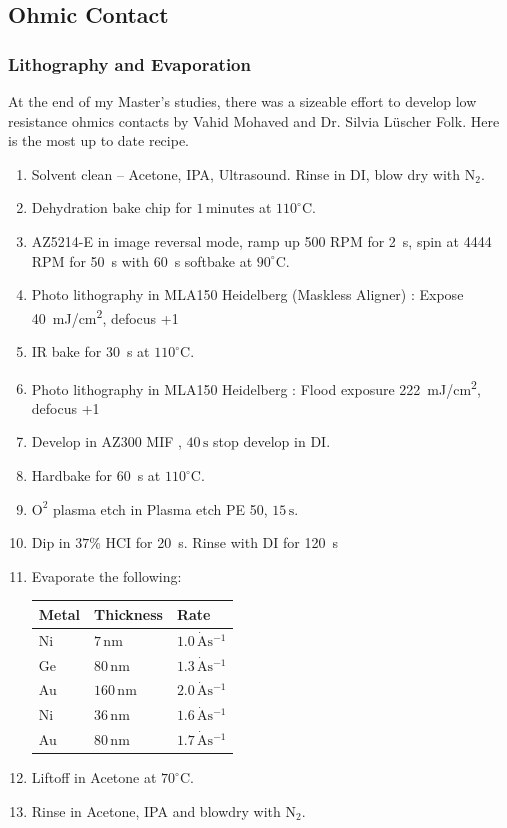 \subsection{Ohmic Contact}

\subsubsection{Lithography and Evaporation}


At the end of my Master's studies, there was a sizeable effort to develop low resistance ohmics contacts by Vahid Mohaved and Dr. Silvia Lüscher Folk. Here is the most up to date recipe. 


\begin{enumerate}
\item Solvent clean – Acetone, IPA, Ultrasound. Rinse in DI, blow dry with $\mathrm{N_2}$.
\item Dehydration bake chip for $1 \,\mathrm{minutes}$ at $110^\circ$C.
\item AZ5214-E in image reversal mode, ramp up 500 RPM for \qty{2}{s}, spin at 4444 RPM for \qty{50}{s} with \qty{60}{s} softbake at $90^\circ$C.
\item Photo lithography in MLA150 Heidelberg (Maskless Aligner) : Expose \qty{40}{mJ/cm^2}, defocus +1 
\item IR bake for \qty{30}{s} at $110^\circ$C.
\item Photo lithography in MLA150 Heidelberg : Flood exposure \qty{222}{mJ/cm^2}, defocus +1 
\item Develop in AZ300 MIF , $40\,\mathrm{s}$ stop develop in DI.
\item Hardbake for \qty{60}{s} at $110^\circ$C.
\item $\mathrm{O^2}$ plasma etch in Plasma etch PE 50, $15\,\mathrm{s}$.
\item Dip in $37\%$ HCI for \qty{20}{s}. Rinse with DI for \qty{120}{s}

\item Evaporate the following:

\begin{table}[H] 
\centering
 \begin{tabular}{|p{2.0cm}|p{2.0cm}|p{2.0cm}|}
 \hline
 Metal & Thickness & Rate\\
 \hline
 Ni & $7\,\mathrm{nm}$ & $1.0\,\mathrm{\dot{A}s^{-1}}$\\
 Ge & $80\,\mathrm{nm}$ & $1.3\,\mathrm{\dot{A}s^{-1}}$\\
 Au & $160\,\mathrm{nm}$ & $2.0\,\mathrm{\dot{A}s^{-1}}$\\
 Ni & $36\,\mathrm{nm}$ & $1.6\,\mathrm{\dot{A}s^{-1}}$\\
 Au & $80\,\mathrm{nm}$ & $1.7\,\mathrm{\dot{A}s^{-1}}$\\
 \hline
 \end{tabular}
\label{tab:ohmic_evaporation}
\end{table}
\item Liftoff in Acetone at $70^\circ$C.
\item Rinse in Acetone, IPA and blowdry with $\mathrm{N_2}$.
\end{enumerate}



